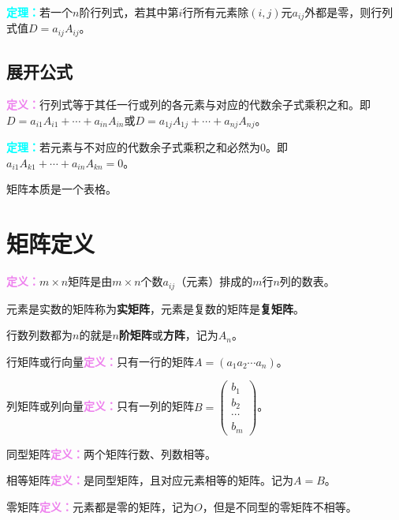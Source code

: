 \documentclass[UTF8, 12pt]{ctexart}
\begin{document}
\textcolor{aqua}{\textbf{定理：}}若一个$n$阶行列式，若其中第$i$行所有元素除$(i,j)$元$a_{ij}$外都是零，则行列式值$D=a_{ij}A_{ij}$。

\subsection{展开公式}

\textcolor{violet}{\textbf{定义：}}行列式等于其任一行或列的各元素与对应的代数余子式乘积之和。即$D=a_{i1}A_{i1}+\cdots+a_{in}A_{in}$或$D=a_{1j}A_{1j}+\cdots+a_{nj}A_{nj}$。

\textcolor{aqua}{\textbf{定理：}}若元素与不对应的代数余子式乘积之和必然为0。即$a_{i1}A_{k1}+\cdots+a_{in}A_{kn}=0$。

矩阵本质是一个表格。

\section{矩阵定义}

\textcolor{violet}{\textbf{定义：}}$m\times n$矩阵是由$m\times n$个数$a_{ij}$（元素）排成的$m$行$n$列的数表。

元素是实数的矩阵称为\textbf{实矩阵}，元素是复数的矩阵是\textbf{复矩阵}。

行数列数都为$n$的就是\textbf{$n$阶矩阵}或\textbf{方阵}，记为$A_n$。

行矩阵或行向量\textcolor{violet}{\textbf{定义：}}只有一行的矩阵$A=(a_1a_2\cdots a_n)$。

列矩阵或列向量\textcolor{violet}{\textbf{定义：}}只有一列的矩阵$B=
\left(\begin{array}{c}
b_1 \\
b_2 \\
\cdots \\
b_m
\end{array}\right)$。

同型矩阵\textcolor{violet}{\textbf{定义：}}两个矩阵行数、列数相等。

相等矩阵\textcolor{violet}{\textbf{定义：}}是同型矩阵，且对应元素相等的矩阵。记为$A=B$。

零矩阵\textcolor{violet}{\textbf{定义：}}元素都是零的矩阵，记为$O$，但是不同型的零矩阵不相等。
\end{document}
